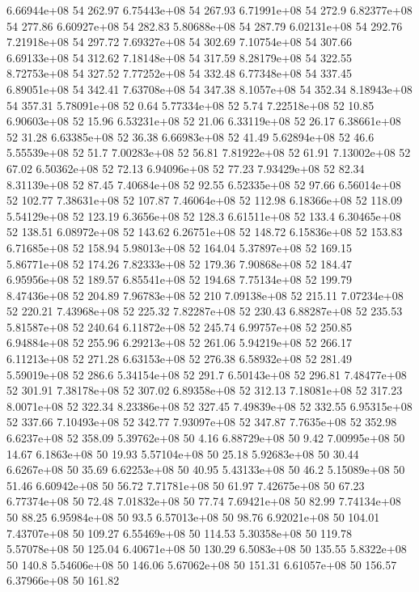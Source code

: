 6.66944e+08 54 262.97
6.75443e+08 54 267.93
6.71991e+08 54 272.9
6.82377e+08 54 277.86
6.60927e+08 54 282.83
5.80688e+08 54 287.79
6.02131e+08 54 292.76
7.21918e+08 54 297.72
7.69327e+08 54 302.69
7.10754e+08 54 307.66
6.69133e+08 54 312.62
7.18148e+08 54 317.59
8.28179e+08 54 322.55
8.72753e+08 54 327.52
7.77252e+08 54 332.48
6.77348e+08 54 337.45
6.89051e+08 54 342.41
7.63708e+08 54 347.38
8.1057e+08 54 352.34
8.18943e+08 54 357.31
5.78091e+08 52 0.64
5.77334e+08 52 5.74
7.22518e+08 52 10.85
6.90603e+08 52 15.96
6.53231e+08 52 21.06
6.33119e+08 52 26.17
6.38661e+08 52 31.28
6.63385e+08 52 36.38
6.66983e+08 52 41.49
5.62894e+08 52 46.6
5.55539e+08 52 51.7
7.00283e+08 52 56.81
7.81922e+08 52 61.91
7.13002e+08 52 67.02
6.50362e+08 52 72.13
6.94096e+08 52 77.23
7.93429e+08 52 82.34
8.31139e+08 52 87.45
7.40684e+08 52 92.55
6.52335e+08 52 97.66
6.56014e+08 52 102.77
7.38631e+08 52 107.87
7.46064e+08 52 112.98
6.18366e+08 52 118.09
5.54129e+08 52 123.19
6.3656e+08 52 128.3
6.61511e+08 52 133.4
6.30465e+08 52 138.51
6.08972e+08 52 143.62
6.26751e+08 52 148.72
6.15836e+08 52 153.83
6.71685e+08 52 158.94
5.98013e+08 52 164.04
5.37897e+08 52 169.15
5.86771e+08 52 174.26
7.82333e+08 52 179.36
7.90868e+08 52 184.47
6.95956e+08 52 189.57
6.85541e+08 52 194.68
7.75134e+08 52 199.79
8.47436e+08 52 204.89
7.96783e+08 52 210
7.09138e+08 52 215.11
7.07234e+08 52 220.21
7.43968e+08 52 225.32
7.82287e+08 52 230.43
6.88287e+08 52 235.53
5.81587e+08 52 240.64
6.11872e+08 52 245.74
6.99757e+08 52 250.85
6.94884e+08 52 255.96
6.29213e+08 52 261.06
5.94219e+08 52 266.17
6.11213e+08 52 271.28
6.63153e+08 52 276.38
6.58932e+08 52 281.49
5.59019e+08 52 286.6
5.34154e+08 52 291.7
6.50143e+08 52 296.81
7.48477e+08 52 301.91
7.38178e+08 52 307.02
6.89358e+08 52 312.13
7.18081e+08 52 317.23
8.0071e+08 52 322.34
8.23386e+08 52 327.45
7.49839e+08 52 332.55
6.95315e+08 52 337.66
7.10493e+08 52 342.77
7.93097e+08 52 347.87
7.7635e+08 52 352.98
6.6237e+08 52 358.09
5.39762e+08 50 4.16
6.88729e+08 50 9.42
7.00995e+08 50 14.67
6.1863e+08 50 19.93
5.57104e+08 50 25.18
5.92683e+08 50 30.44
6.6267e+08 50 35.69
6.62253e+08 50 40.95
5.43133e+08 50 46.2
5.15089e+08 50 51.46
6.60942e+08 50 56.72
7.71781e+08 50 61.97
7.42675e+08 50 67.23
6.77374e+08 50 72.48
7.01832e+08 50 77.74
7.69421e+08 50 82.99
7.74134e+08 50 88.25
6.95984e+08 50 93.5
6.57013e+08 50 98.76
6.92021e+08 50 104.01
7.43707e+08 50 109.27
6.55469e+08 50 114.53
5.30358e+08 50 119.78
5.57078e+08 50 125.04
6.40671e+08 50 130.29
6.5083e+08 50 135.55
5.8322e+08 50 140.8
5.54606e+08 50 146.06
5.67062e+08 50 151.31
6.61057e+08 50 156.57
6.37966e+08 50 161.82
